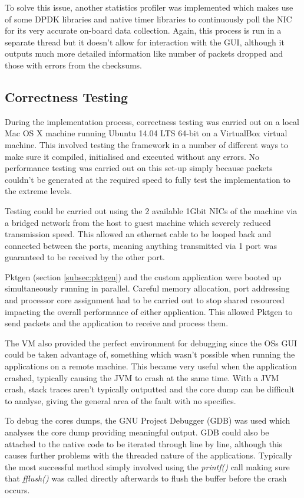 \documentclass[final_report.tex]{subfiles}
\begin{document}
To solve this issue, another statistics profiler was implemented which makes use of some DPDK libraries and native timer libraries to continuously poll the NIC for its very accurate on-board data collection. Again, this process is run in a separate thread but it doesn't allow for interaction with the GUI, although it outputs much more detailed information like number of packets dropped and those with errors from the checksums.

\subsection{Correctness Testing}
During the implementation process, correctness testing was carried out on a local Mac OS X machine running Ubuntu 14.04 LTS 64-bit on a VirtualBox  virtual machine. This involved testing the framework in a number of different ways to make sure it compiled, initialised and executed without any errors. No performance testing was carried out on this set-up simply because packets couldn't be generated at the required speed to fully test the implementation to the extreme levels.

Testing could be carried out using the 2 available 1Gbit NICs of the machine via a bridged network from the host to guest machine which severely reduced transmission speed. This allowed an ethernet cable to be looped back and connected between the ports, meaning anything transmitted via 1 port was guaranteed to be received by the other port.

Pktgen (section \ref{subsec:pktgen}) and the custom application were booted up simultaneously running in parallel. Careful memory allocation, port addressing and processor core assignment had to be carried out to stop shared resourced impacting the overall performance of either application. This allowed Pktgen to send packets and the application to receive and process them.

The VM also provided the perfect environment for debugging since the OSs GUI could be taken advantage of, something which wasn't possible when running the applications on a remote machine.  This became very useful when the application crashed, typically causing the JVM to crash at the same time. With a JVM crash, stack traces aren't typically outputted and the core dump can be difficult to analyse, giving the general area of the fault with no specifics.

To debug the cores dumps, the GNU Project Debugger (GDB) was used which analyses the core dump providing meaningful output. GDB could also be attached to the native code to be iterated through line by line, although this causes further problems with the threaded nature of the applications. Typically the most successful method simply involved using the \textit{printf()} call making sure that \textit{fflush()} was called directly afterwards to flush the buffer before the crash occurs.
\end{document}
